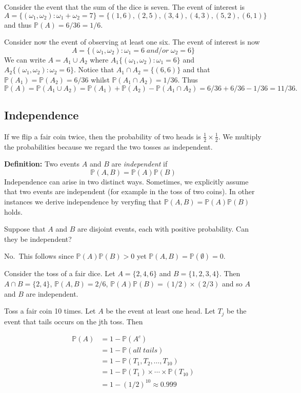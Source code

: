 \documentclass[
]{book}
\theoremstyle{definition}
\theoremstyle{definition}
\theoremstyle{definition}
\theoremstyle{definition}
\theoremstyle{remark}
\begin{document}
Consider the event that the sum of the dice is seven. The event of interest is
\[
A=\{(\omega_1,\omega_2):\omega_1+\omega_2=7\}=\{(1,6),(2,5),(3,4),(4,3),(5,2),(6,1)\}
\]
and thus \(\mathbb{P}(A)=6/36=1/6\).

Consider now the event of observing at least one six. The event of interest is now
\[
A=\{(\omega_1,\omega_2): \omega_1=6 \; and/or \; \omega_2=6\}
\]
We can write \(A=A_1\cup A_2\) where \(A_1\{(\omega_1,\omega_2): \omega_1=6 \}\) and \(A_2\{(\omega_1,\omega_2): \omega_2=6 \}\). Notice that \(A_1\cap A_2 =\{(6,6)\}\) and that \(\mathbb{P}(A_1)=\mathbb{P}(A_2)=6/36\) whilst \(\mathbb{P}(A_1\cap A_2)=1/36\). Thus
\[
\mathbb{P}(A)=\mathbb{P}(A_1\cup A_2)=\mathbb{P}(A_1)+\mathbb{P}(A_2)-\mathbb{P}(A_1\cap A_2)=6/36+ 6/36 -1/36 =11/36.
\]

\hypertarget{independence}{%
\subsection{Independence}\label{independence}}

If we flip a fair coin twice, then the probability of two heads is \(\frac{1}{2}\times \frac{1}{2}\). We multiply the probabilities because we regard the two tosses as independent.

\textbf{Definition:} Two events \(A\) and \(B\) are \emph{independent} if
\[
\mathbb{P}(A,B)=\mathbb{P}(A)\mathbb{P}(B)
\]
Independence can arise in two distinct ways. Sometimes, we explicitly assume that two events are independent (for example in the toss of two coins). In other instances we derive independence by veryfing that \(\mathbb{P}(A,B)=\mathbb{P}(A)\mathbb{P}(B)\) holds.

Suppose that \(A\) and \(B\) are disjoint events, each with positive probability. Can they be independent?

No.~This follows since \(\mathbb{P}(A)\mathbb{P}(B)>0\) yet \(\mathbb{P}(A,B)=\mathbb{P}(\emptyset)=0.\)

Consider the toss of a fair dice. Let \(A=\{2,4,6\}\) and \(B=\{1,2,3,4\}\). Then \(A\cap B = \{2,4\}\), \(\mathbb{P}(A,B)=2/6\), \(\mathbb{P}(A)\mathbb{P}(B)=(1/2)\times (2/3)\) and so \(A\) and \(B\) are independent.

Toss a fair coin 10 times. Let \(A\) be the event at least one head. Let \(T_j\) be the event that tails occurs on the jth toss. Then

\begin{align}
\mathbb{P}(A) & = 1 - \mathbb{P}(A^c)\\
& = 1- \mathbb{P}(all\; tails)\\
& = 1- \mathbb{P}(T_1,T_2,\dots,T_{10})\\
& = 1- \mathbb{P}(T_1)\times\cdots\times\mathbb{P}(T_{10})\\
& = 1- (1/2)^{10}\approx 0.999
\end{align}
\end{document}

